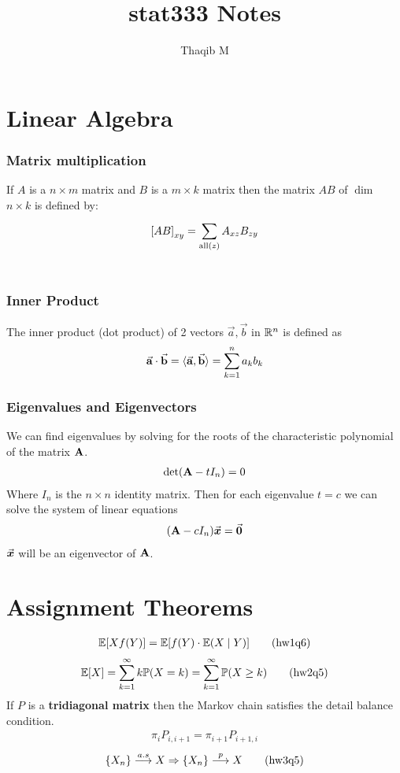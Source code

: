 \documentclass[12pt,a4paper]{article}
\author{Thaqib M}
\title{stat333 Notes}
\begin{document}
\maketitle
\newpage
\section*{Linear Algebra}
\subsubsection*{Matrix multiplication} If $A$ is a $n\times m$ matrix and $B$ is a $m\times k$ matrix then the matrix $AB$ of $\dim$ $n\times k$ is defined by: 
\begin{align*}
    {\bf[}AB{\bf]}_{xy} = \sum\limits_{\mathrm{all}(z)}^{}A_{xz}B_{zy}
\end{align*}
\\
\subsubsection*{Inner Product} The inner product (dot product) of 2 vectors $\vec{a}, \vec{b}$ in $\mathbb{R}^n$ is defined as
\begin{align*}
    \va{a}\cdot \va{b} = \langle\va{a},\va{b}\rangle = \sum\limits_{k=1}^{n}a_kb_k
\end{align*}
\subsubsection*{Eigenvalues and Eigenvectors}
We can find eigenvalues by solving for the roots of the characteristic polynomial of the matrix $\vb A$.
\begin{align*}
    \det(\vb A-tI_n) = 0
\end{align*}
Where $I_n$ is the $n\times n$ identity matrix.
Then for each eigenvalue $t=c$ we can solve the system of linear equations 
\begin{align*}
    (\vb A - cI_n)\va* x = \va* 0
\end{align*}
$\va* x$ will be an eigenvector of $\vb A$. 
\newpage
\section*{Assignment Theorems}
\begin{align*}
    \mathbb{E}[Xf(Y)] = \mathbb{E}[f(Y)\cdot\mathbb{E}(X\;\vert\; Y)] \tag{hw1q6}
\end{align*}
\begin{align*}
    \mathbb{E}[X] = \sum\limits_{k=1}^{\infty}k\mathbb{P}(X=k) = \sum\limits_{k=1}^{\infty} \mathbb{P}(X\geq k) \tag{hw2q5}
\end{align*}
If $P$ is a \textbf{tridiagonal matrix} then the Markov chain satisfies the detail balance condition. 
\begin{align*}
    \pi_i P_{i, i+1} = \pi_{i+1}P_{i+1, i} \tag{hw2q7}
\end{align*}
\begin{align*}
    \{X_n\} \overset{a.s}{\longrightarrow} X \Rightarrow \{X_n\}\overset{p}{\longrightarrow} X \tag{hw3q5}
\end{align*}
\newpage
\end{document}
